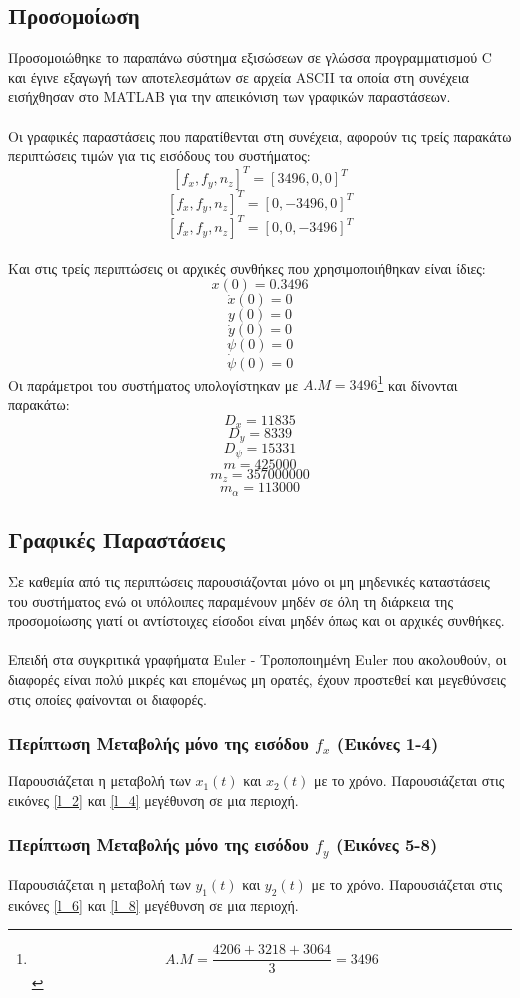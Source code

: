 \documentclass{article}
\begin{document}
\subsection{Προσoμοίωση}
Προσομοιώθηκε το παραπάνω σύστημα εξισώσεων σε γλώσσα προγραμματισμού C και έγινε εξαγωγή των αποτελεσμάτων σε αρχεία ASCII τα οποία στη συνέχεια εισήχθησαν στο MATLAB για την απεικόνιση των γραφικών παραστάσεων.
\\\\
Οι γραφικές παραστάσεις που παρατίθενται στη συνέχεια, αφορούν τις τρείς παρακάτω περιπτώσεις τιμών για τις εισόδους του συστήματος:
\[[f_x, f_y, n_z]^T = [3496, 0, 0]^T\]
\[[f_x, f_y, n_z]^T = [0, -3496, 0]^T\]
\[[f_x, f_y, n_z]^T = [0, 0, -3496]^T\] 
 \\
Και στις τρείς περιπτώσεις οι αρχικές συνθήκες που χρησιμοποιήθηκαν είναι ίδιες:
\[x(0) = 0.3496\]
\[\dot{x}(0) = 0\]
\[y(0) = 0\]
\[\dot{y}(0) = 0\]
\[\psi(0) = 0\]
\[\dot{\psi}(0) = 0\]
Οι παράμετροι του συστήματος υπολογίστηκαν με \(Α.Μ = 3496\)\footnote{\[A.M = \frac{4206 + 3218 + 3064}{3} = 3496\]} και δίνονται παρακάτω:
\[D_x = 11835\]
\[D_y = 8339\]
\[D_\psi = 15331\]
\[m = 425000\]
\[m_z = 357000000\]
\[m_\alpha = 113000\]

\newpage
\subsection{Γραφικές Παραστάσεις}
Σε καθεμία από τις περιπτώσεις παρουσιάζονται μόνο οι μη μηδενικές καταστάσεις του συστήματος ενώ οι υπόλοιπες παραμένουν μηδέν σε όλη τη διάρκεια της προσομοίωσης γιατί οι αντίστοιχες είσοδοι είναι μηδέν όπως και οι αρχικές συνθήκες.
\\\\
Επειδή στα συγκριτικά γραφήματα Euler - Τροποποιημένη Euler που ακολουθούν, οι διαφορές είναι πολύ μικρές και επομένως μη ορατές, έχουν προστεθεί και μεγεθύνσεις στις οποίες φαίνονται οι διαφορές.
\subsubsection{Περίπτωση Μεταβολής μόνο της εισόδου \(f_x\) (Εικόνες 1-4)}
Παρουσιάζεται η μεταβολή των \(x_1(t)\) και \(x_2(t)\) με το χρόνο. Παρουσιάζεται στις εικόνες \ref{l_2} και \ref{l_4} μεγέθυνση σε μια περιοχή. 

\subsubsection{Περίπτωση Μεταβολής μόνο της εισόδου \(f_y\) (Εικόνες 5-8)}
Παρουσιάζεται η μεταβολή των \(y_1(t)\) και \(y_2(t)\) με το χρόνο. Παρουσιάζεται στις εικόνες \ref{l_6} και \ref{l_8} μεγέθυνση σε μια περιοχή.
\end{document}
